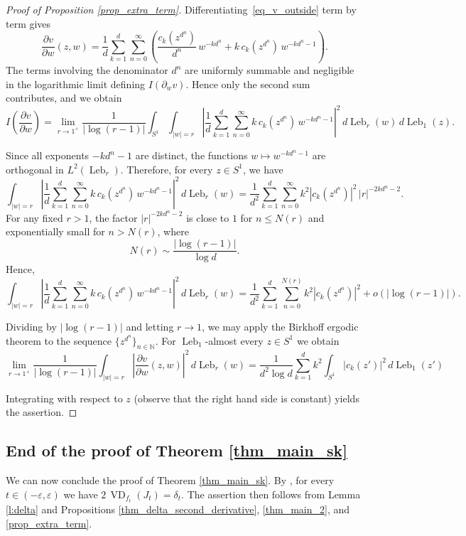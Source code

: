 \documentclass[11pt]{amsart}
\theoremstyle{plain}
\theoremstyle{definition}
\theoremstyle{remark}
\DeclareMathOperator{\VD}{VD}
\DeclareMathOperator{\Leb}{Leb}
\begin{document}
\begin{proof}[Proof of Proposition \ref{prop_extra_term}]
Differentiating~\eqref{eq_v_outside}
 term by term gives
\[
\frac{\partial v}{\partial w}(z,w)
=
\frac{1}{d}
\sum_{k=1}^d\sum_{n=0}^{\infty}
\left(
\frac{c_k(z^{d^n})}{d^n}\,w^{-k d^n}
+
k\,c_k(z^{d^n})\,w^{-k d^n-1}
\right).
\]
The terms involving the denominator $d^{n}
$ are uniformly summable and negligible in the
logarithmic limit defining $I(\partial_w v)$.
Hence only the second sum contributes, and we obtain
\[
I\!\left(\frac{\partial v}{\partial w}\right)
=
\lim_{r\to1^+}
\frac{1}{|\log(r-1)|}
\int_{S^1}
\int_{|w|=r}
\left|
\frac{1}{d}
\sum_{k=1}^d
\sum_{n=0}^{\infty}
k\,c_k(z^{d^n})\,w^{-k d^n-1}
\right|^2
\, 
d\Leb_r(w)\,
d\Leb_1(z).
\]

Since all exponents $-k d^n-1$ are distinct, the functions
$w\mapsto w^{-k d^n-1}$
 are orthogonal in $L^2(\Leb_r)$.
Therefore, for every $z\in S^1$, we have
\[
\int_{|w|=r}
\left|
\frac{1}{d}
\sum_{k=1}^d
\sum_{n=0}^{\infty}
k\,c_k(
z^{d^n}
)\,w^{-k d^n-1}
\right|^2
\,
d\Leb_r (w)
=
\frac{1}{d^2}
\sum_{k=1}^d\sum_{n=0}^{\infty}
k^2|c_k(z^{d^n})|^2\,|r|^{-2k d^n-2}.
\]
For any fixed $r>1$,
 the factor $|r|^{-2k d^n-2}$
  is close to $1$ for
$n\le N(r)$ and exponentially small for $n>N(r)$, where
\[
N(r)\sim\frac{|\log(r-1)|}{\log d}.
\]
Hence,
\[
\int_{|w|=r}
\left|
\frac{1}{d}
\sum_{k=1}^d
\sum_{n=0}^{\infty}
k\,c_k(z^{d^n})\,w^{-k d^n-1}
\right|^2
\,
d\Leb_r (w)
=
\frac{1}{d^2}
\sum_{k=1}^d\sum_{n=0}^{N(r)}
k^2|c_k(z^{d^n})|^2
+
o(|\log(r-1)|).
\]

Dividing by $|\log(r-1)|$ and letting $r\to1$, we may apply the Birkhoff
ergodic theorem to the sequence $\{z^{d^n}\}_{n\in \mathbb N}$.
For 
$\Leb_1$-almost every $z\in S^1$
 we obtain
\[
\lim_{r\to1^+}
\frac{1}{|\log(r-1)|}
\int_{|w|=r}
\left|\frac{\partial v}{\partial w}(z,w)\right|^2\,
d\Leb_r (w)
=
\frac{1}{d^2\log d}
\sum_{k=1}^d
k^2\int_{S^1}|c_k(z')|^2\,
d\Leb_1(z')
\]

Integrating with respect to $z$
(observe that the right hand side is constant)
 yields the assertion.
\end{proof}


\subsection{End of the proof of Theorem \ref{thm_main_sk}}


We can now conclude the proof of Theorem \ref{thm_main_sk}.
By \cite[Theorem~1.3]{BHMane}, for every 
 $t\in(-\varepsilon,\varepsilon)$ we have $2\,\VD_{f_t}(J_t)=\delta_t$. The assertion then follows
  from Lemma \ref{l:delta} and
 Propositions \ref{thm_delta_second_derivative}, \ref{thm_main_2}, and \ref{prop_extra_term}.
\end{document}
